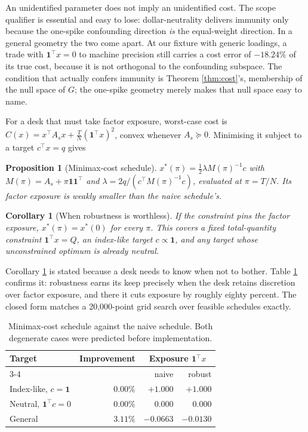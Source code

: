 \documentclass[10pt,twocolumn]{article}
\newtheorem{proposition}{Proposition}
\newtheorem{corollary}{Corollary}
\theoremstyle{remark}
\begin{document}
An unidentified parameter does not imply an unidentified cost. The scope
qualifier is essential and easy to lose: dollar-neutrality delivers immunity
only because the one-spike confounding direction \emph{is} the equal-weight
direction. In a general geometry the two come apart. At our fixture with
generic loadings, a trade with $\mathbf 1^\top x=0$ to machine precision still
carries a cost error of $-18.24\%$ of its true cost, because it is not
orthogonal to the confounding subspace. The condition that actually confers
immunity is Theorem \ref{thm:cost}'s, membership of the null space of $G$; the
one-spike geometry merely makes that null space easy to name.

For a desk that must take factor exposure, worst-case cost is
$\widehat C(x)=x^\top A_sx+\tfrac{T}{N}(\mathbf 1^\top x)^2$, convex whenever
$A_s\succeq0$. Minimising it subject to a target $c^\top x=q$ gives

\begin{proposition}[Minimax-cost schedule]
\label{prop:minimax}
$x^*(\pi)=\tfrac12\lambda M(\pi)^{-1}c$ with $M(\pi)=A_s+\pi\mathbf
1\mathbf 1^\top$ and $\lambda=2q/(c^\top M(\pi)^{-1}c)$, evaluated at
$\pi=T/N$. Its factor exposure is weakly smaller than the naive schedule's.
\end{proposition}

\begin{corollary}[When robustness is worthless]
\label{cor:degenerate}
If the constraint pins the factor exposure, $x^*(\pi)=x^*(0)$ for every $\pi$.
This covers a fixed total-quantity constraint $\mathbf 1^\top x=Q$, an
index-like target $c\propto\mathbf 1$, and any target whose unconstrained
optimum is already neutral.
\end{corollary}

Corollary \ref{cor:degenerate} is stated because a desk needs to know when not
to bother. Table \ref{tab:robust} confirms it: robustness earns its keep
precisely when the desk retains discretion over factor exposure, and there it
cuts exposure by roughly eighty percent. The closed form matches a
20{,}000-point grid search over feasible schedules exactly.

\begin{table}[t]
\centering
\caption{Minimax-cost schedule against the naive schedule. Both degenerate
cases were predicted before implementation.}
\label{tab:robust}
\small
\begin{tabular}{@{}lrrr@{}}
\toprule
Target & Improvement & \multicolumn{2}{c}{Exposure $\mathbf 1^\top x$} \\
\cmidrule(l){3-4}
 & & naive & robust \\
\midrule
Index-like, $c=\mathbf 1$ & $0.00\%$ & $+1.000$ & $+1.000$ \\
Neutral, $\mathbf 1^\top c=0$ & $0.00\%$ & $0.000$ & $0.000$ \\
General & $\mathbf{3.11\%}$ & $-0.0663$ & $\mathbf{-0.0130}$ \\
\bottomrule
\end{tabular}
\end{table}
\end{document}
